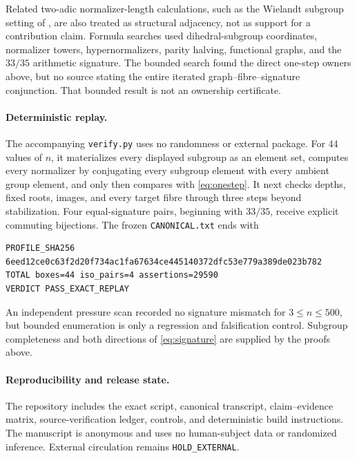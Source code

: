 \documentclass[10pt,a4paper]{amsart}
\theoremstyle{remark}
\begin{document}
Related two-adic normalizer-length calculations, such as the Wielandt
subgroup setting of \citet{ShelashAshrafi2020}, are also treated as structural
adjacency, not as support for a contribution claim.  Formula searches used
dihedral-subgroup coordinates, normalizer towers, hypernormalizers, parity
halving, functional graphs, and the \(33/35\) arithmetic signature.  The
bounded search found the direct one-step owners above, but no source stating
the entire iterated graph--fibre--signature conjunction.  That bounded result
is not an ownership certificate.

\paragraph{Deterministic replay.}
The accompanying \texttt{verify.py} uses no randomness or external package.
For 44 values of \(n\), it materializes every displayed subgroup as an
element set, computes every normalizer by conjugating every subgroup element
with every ambient group element, and only then compares with
\eqref{eq:onestep}.  It next checks depths, fixed roots, images, and every
target fibre through three steps beyond stabilization.  Four equal-signature
pairs, beginning with \(33/35\), receive explicit commuting bijections.  The
frozen \texttt{CANONICAL.txt} ends with
\begin{verbatim}
PROFILE_SHA256 6eed12ce0c63f2d20f734ac1fa67634ce445140372dfc53e779a389de023b782
TOTAL boxes=44 iso_pairs=4 assertions=29590
VERDICT PASS_EXACT_REPLAY
\end{verbatim}
An independent pressure scan recorded no signature mismatch for
\(3\leq n\leq500\), but bounded enumeration is only a regression and
falsification control.  Subgroup completeness and both directions of
\eqref{eq:signature} are supplied by the proofs above.

\paragraph{Reproducibility and release state.}
The repository includes the exact script, canonical transcript,
claim--evidence matrix, source-verification ledger, controls, and deterministic
build instructions.  The manuscript is anonymous and uses no human-subject
data or randomized inference.  External circulation remains
\texttt{HOLD\_EXTERNAL}.



\end{document}
